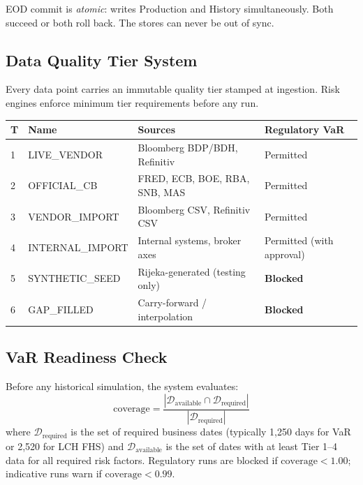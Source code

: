 \documentclass[11pt, a4paper]{article}
\begin{document}
EOD commit is \emph{atomic}: writes Production and History simultaneously.
Both succeed or both roll back. The stores can never be out of sync.

\subsection{Data Quality Tier System}

Every data point carries an immutable quality tier stamped at ingestion.
Risk engines enforce minimum tier requirements before any run.

\begin{center}
\begin{tabular}{C{0.5cm} L{3.5cm} L{5.5cm} L{2.8cm}}
\toprule
\textbf{T} & \textbf{Name} & \textbf{Sources} & \textbf{Regulatory VaR} \\
 & LIVE\_VENDOR & Bloomberg BDP/BDH, Refinitiv & Permitted \\
2 & OFFICIAL\_CB & FRED, ECB, BOE, RBA, SNB, MAS & Permitted \\
3 & VENDOR\_IMPORT & Bloomberg CSV, Refinitiv CSV & Permitted \\
4 & INTERNAL\_IMPORT & Internal systems, broker axes & Permitted (with approval) \\
5 & SYNTHETIC\_SEED & Rijeka-generated (testing only) & \textbf{Blocked} \\
6 & GAP\_FILLED & Carry-forward / interpolation & \textbf{Blocked} \\
\bottomrule
\end{tabular}
\end{center}

\subsection{VaR Readiness Check}

Before any historical simulation, the system evaluates:
\begin{equation}
  \text{coverage} = \frac{|\mathcal{D}_{\text{available}} \cap \mathcal{D}_{\text{required}}|}{|\mathcal{D}_{\text{required}}|}
\end{equation}
where $\mathcal{D}_{\text{required}}$ is the set of required business dates
(typically 1,250 days for VaR or 2,520 for LCH FHS) and
$\mathcal{D}_{\text{available}}$ is the set of dates with at least Tier 1–4
data for all required risk factors. Regulatory runs are blocked if
$\text{coverage} < 1.00$; indicative runs warn if $\text{coverage} < 0.99$.
\end{document}
